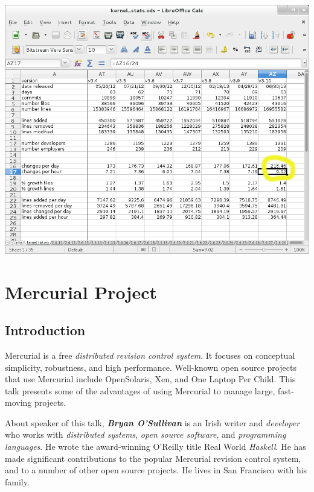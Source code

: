 \documentclass[11pt]{article}
\begin{document}
\hfill\includegraphics[scale=0.4]{img/kernel310rate}\hspace*{\fill}

\newpage

\section{Mercurial Project}

\subsection{Introduction}
Mercurial is a free \emph{distributed revision control system}. It focuses on conceptual simplicity, robustness, and high performance. Well-known open source projects that use Mercurial include OpenSolaris, Xen, and One Laptop Per Child. This talk presents some of the advantages of using Mercurial to manage large, fast-moving projects.

About speaker of this talk, \textbf{\emph{Bryan O'Sullivan}} is an Irish writer and \emph{developer} who works with \emph{distributed systems}, \emph{open source software}, and \emph{programming languages}. He wrote the award-winning O'Reilly title Real World \emph{Haskell}. He has made significant contributions to the popular Mercurial revision control system, and to a number of other open source projects. He lives in San Francisco with his family. 
\end{document}
